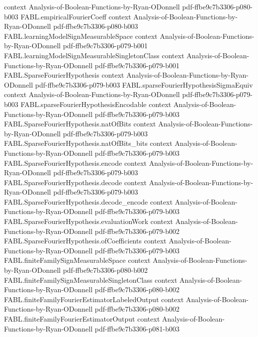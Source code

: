 \begin{theorem}
  {context}
  {Analysis-of-Boolean-Functions-by-Ryan-ODonnell}
  {pdf-ffbe9c7b3306-p080-b003}
\proofstep
  {FABL.empiricalFourierCoeff}
  {context}
  {Analysis-of-Boolean-Functions-by-Ryan-ODonnell}
  {pdf-ffbe9c7b3306-p080-b003}
\proofstep
  {FABL.learningModelSignMeasurableSpace}
  {context}
  {Analysis-of-Boolean-Functions-by-Ryan-ODonnell}
  {pdf-ffbe9c7b3306-p079-b001}
\proofstep
  {FABL.learningModelSignMeasurableSingletonClass}
  {context}
  {Analysis-of-Boolean-Functions-by-Ryan-ODonnell}
  {pdf-ffbe9c7b3306-p079-b001}
\proofstep
  {FABL.SparseFourierHypothesis}
  {context}
  {Analysis-of-Boolean-Functions-by-Ryan-ODonnell}
  {pdf-ffbe9c7b3306-p079-b003}
\proofstep
  {FABL.sparseFourierHypothesisSigmaEquiv}
  {context}
  {Analysis-of-Boolean-Functions-by-Ryan-ODonnell}
  {pdf-ffbe9c7b3306-p079-b003}
\proofstep
  {FABL.sparseFourierHypothesisEncodable}
  {context}
  {Analysis-of-Boolean-Functions-by-Ryan-ODonnell}
  {pdf-ffbe9c7b3306-p079-b003}
\proofstep
  {FABL.SparseFourierHypothesis.natOfBits}
  {context}
  {Analysis-of-Boolean-Functions-by-Ryan-ODonnell}
  {pdf-ffbe9c7b3306-p079-b003}
\proofstep
  {FABL.SparseFourierHypothesis.natOfBits_bits}
  {context}
  {Analysis-of-Boolean-Functions-by-Ryan-ODonnell}
  {pdf-ffbe9c7b3306-p079-b003}
\proofstep
  {FABL.SparseFourierHypothesis.encode}
  {context}
  {Analysis-of-Boolean-Functions-by-Ryan-ODonnell}
  {pdf-ffbe9c7b3306-p079-b003}
\proofstep
  {FABL.SparseFourierHypothesis.decode}
  {context}
  {Analysis-of-Boolean-Functions-by-Ryan-ODonnell}
  {pdf-ffbe9c7b3306-p079-b003}
\proofstep
  {FABL.SparseFourierHypothesis.decode_encode}
  {context}
  {Analysis-of-Boolean-Functions-by-Ryan-ODonnell}
  {pdf-ffbe9c7b3306-p079-b003}
\proofstep
  {FABL.SparseFourierHypothesis.evaluationWork}
  {context}
  {Analysis-of-Boolean-Functions-by-Ryan-ODonnell}
  {pdf-ffbe9c7b3306-p079-b002}
\proofstep
  {FABL.SparseFourierHypothesis.ofCoefficients}
  {context}
  {Analysis-of-Boolean-Functions-by-Ryan-ODonnell}
  {pdf-ffbe9c7b3306-p079-b003}
\proofstep
  {FABL.finiteFamilySignMeasurableSpace}
  {context}
  {Analysis-of-Boolean-Functions-by-Ryan-ODonnell}
  {pdf-ffbe9c7b3306-p080-b002}
\proofstep
  {FABL.finiteFamilySignMeasurableSingletonClass}
  {context}
  {Analysis-of-Boolean-Functions-by-Ryan-ODonnell}
  {pdf-ffbe9c7b3306-p080-b002}
\proofstep
  {FABL.finiteFamilyFourierEstimatorLabeledOutput}
  {context}
  {Analysis-of-Boolean-Functions-by-Ryan-ODonnell}
  {pdf-ffbe9c7b3306-p080-b002}
\proofstep
  {FABL.finiteFamilyFourierEstimatorOutput}
  {context}
  {Analysis-of-Boolean-Functions-by-Ryan-ODonnell}
  {pdf-ffbe9c7b3306-p081-b003}

\end{theorem}
